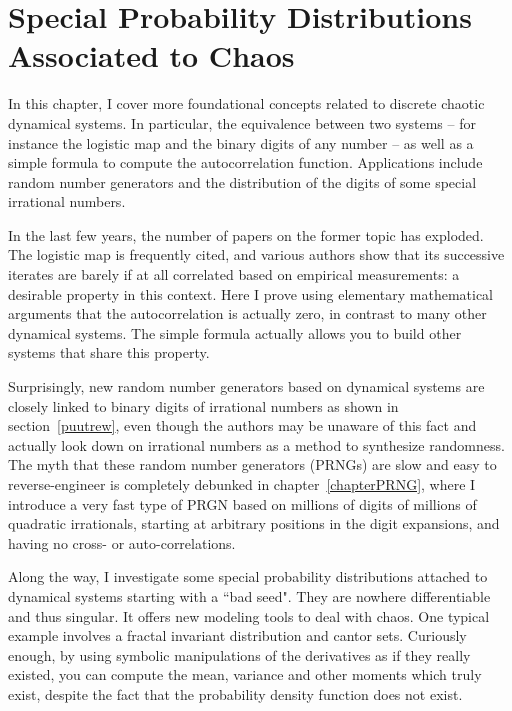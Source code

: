 \documentclass[oneside,10pt]{book}
\begin{document}

\chapter{Special Probability Distributions Associated to Chaos}

In this chapter, I cover more foundational concepts related to discrete chaotic dynamical systems. In particular, the equivalence between two systems -- for instance the logistic map and the binary digits of any number  -- as well as a simple formula to compute the autocorrelation function. Applications include random number generators and the 
 distribution of the digits of some special irrational numbers.  

In the last few years, the number of papers on the former topic 
 has exploded. The logistic map is frequently cited, and various authors show that its successive iterates are barely if at all correlated based on
 empirical measurements: a desirable property in this context. Here I prove using elementary mathematical arguments that the 
autocorrelation is actually zero, in contrast to many other dynamical systems. The simple formula actually  allows you to build other systems 
 that share this property.  

Surprisingly, new random number generators based on dynamical systems are closely linked to binary
 digits of irrational numbers as shown in section~\ref{puutrew}, even though the authors may be unaware of this fact and actually look down on irrational numbers 
 as a method to 
 synthesize randomness. The myth that these random number generators (PRNGs) are slow and easy to reverse-engineer is completely
 debunked in chapter~\ref{chapterPRNG}, where I introduce a very fast type of PRGN based on millions of digits of millions of
 quadratic irrationals, starting at arbitrary positions in the digit expansions, and having no cross- or auto-correlations.

Along the way, I investigate some special probability distributions attached to dynamical systems starting with a ``bad seed". They
 are  nowhere differentiable and thus singular. It offers new modeling tools to deal
 with chaos. One typical example involves a fractal invariant distribution and cantor sets.
Curiously enough, by using symbolic manipulations of the derivatives as if they really existed, you can compute the mean, variance and other moments which truly exist, despite the fact that the probability density function does not exist. 
\end{document}
